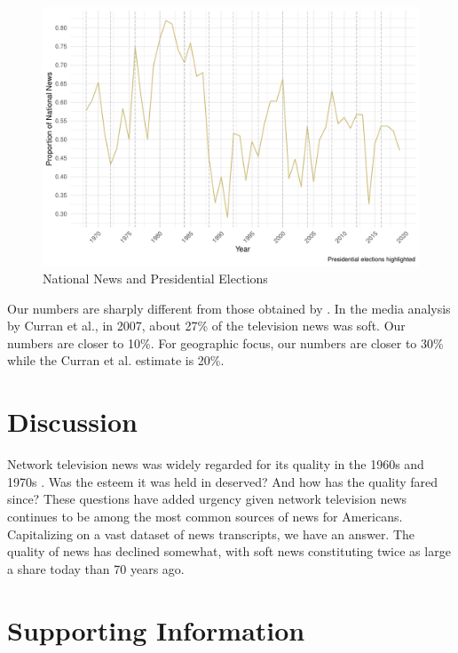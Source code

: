 \documentclass[12pt, letterpaper]{article}
\begin{document}
\begin{figure}[H]
  \centering
  \caption{National News and Presidential Elections}
  \label{fig:national_president}
  \includegraphics[width=.95\linewidth]{../figs/fig_geography_presidential.pdf}
\end{figure}

Our numbers are sharply different from those obtained by \cite{curran2009media}. In the media analysis by Curran et al., in 2007, about 27\% of the television news was soft. Our numbers are closer to 10\%. For geographic focus, our numbers are closer to 30\% while the Curran et al. estimate is 20\%. 

\section*{Discussion}
Network television news was widely regarded for its quality in the 1960s and 1970s \citep{hallin1990whatever}. Was the esteem it was held in deserved? And how has the quality fared since? These questions have added urgency given network television news continues to be among the most common sources of news for Americans. Capitalizing on a vast dataset of news transcripts, we have an answer. The quality of news has declined somewhat, with soft news constituting twice as large a share today than 70 years ago. 

\clearpage

  

\clearpage
\appendix
\renewcommand{\thesection}{SI \arabic{section}}
\renewcommand\thetable{\thesection.\arabic{table}}  
\renewcommand\thefigure{\thesection.\arabic{figure}}

\section{Supporting Information}
\end{document}

